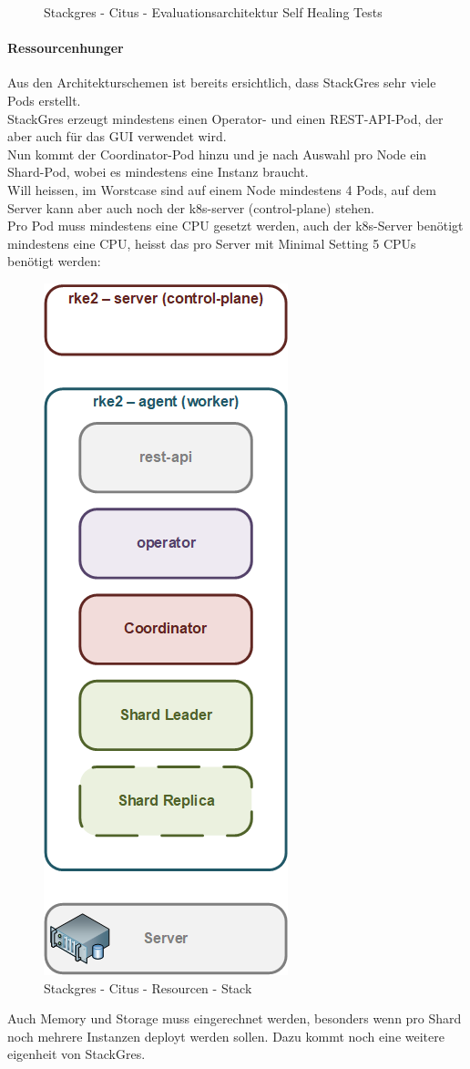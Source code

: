 \begin{flushleft}
\begin{figure}[H]
        \caption{Stackgres - Citus - Evaluationsarchitektur Self Healing Tests}
        \label{fig:stackgres_citus_architecture_self_healing_test}
    \end{figure}
\end{flushleft}
\begin{flushleft}
    \paragraph{Ressourcenhunger}
    Aus den Architekturschemen ist bereits ersichtlich, dass StackGres sehr viele Pods erstellt.\\
    StackGres erzeugt mindestens einen Operator- und einen REST-API-Pod, der aber auch für das GUI verwendet wird.\\
    Nun kommt der Coordinator-Pod hinzu und je nach Auswahl pro Node ein Shard-Pod, wobei es mindestens eine Instanz braucht.\\
    Will heissen, im Worstcase sind auf einem Node mindestens 4 Pods, auf dem Server kann aber auch noch der k8s-server (control-plane) stehen.\\
    Pro Pod muss mindestens eine CPU gesetzt werden, auch der k8s-Server benötigt mindestens eine CPU, heisst das pro Server mit Minimal Setting 5 CPUs benötigt werden:
    \begin{figure}[H]
        \centering
        \includegraphics[width=0.2\linewidth]{source/implementation/evaluation/postgresql_ha_solutions/stackgres/stackgres_citus_architecture_resource_stack}
        \caption{Stackgres - Citus - Resourcen - Stack}
        \label{fig:stackgres_citus_architecture_resource_stack}
    \end{figure}
    Auch Memory und Storage muss eingerechnet werden, besonders wenn pro Shard noch mehrere Instanzen deployt werden sollen.
    Dazu kommt noch eine weitere eigenheit von StackGres.
\end{flushleft}
